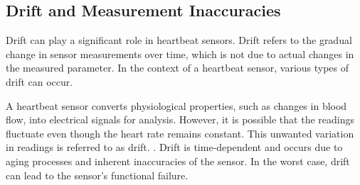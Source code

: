 {\begin{center}
\begin{adjustbox}{valign=t}
        
    \end{adjustbox}
    \label{fig:StructureSensor}
\end{center}


\subsection{Drift and Measurement Inaccuracies}

Drift can play a significant role in heartbeat sensors. Drift refers to the gradual change in sensor measurements over time, which is not due to actual changes in the measured parameter. In the context of a heartbeat sensor, various types of drift can occur.

A heartbeat sensor converts physiological properties, such as changes in blood flow, into electrical signals for analysis. However, it is possible that the readings fluctuate even though the heart rate remains constant. This unwanted variation in readings is referred to as drift. \cite{Traenkler:2014}. Drift is time-dependent and occurs due to aging processes and inherent inaccuracies of the sensor. In the worst case, drift can lead to the sensor's functional failure.

\begin{itemize}[label={}]
    

\end{itemize}}
